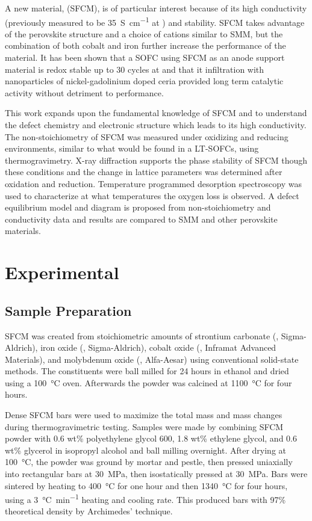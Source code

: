     A new material,  (SFCM), is of particular interest because of its high conductivity (previously measured to be \SI{35}{S\per\centi\meter} at ) and stability.\cite{Pan}
    SFCM takes advantage of the perovskite structure and a choice of cations similar to SMM, but the combination of both cobalt and iron further increase the performance of the material.
    It has been shown that a SOFC using SFCM as an anode support material is redox stable up to 30 cycles at  and that it infiltration with nanoparticles of nickel-gadolinium doped ceria provided long term catalytic activity without detriment to performance.\cite{Hussaina,Hussain}

    This work expands upon the fundamental knowledge of SFCM and to understand the defect chemistry and electronic structure which leads to its high conductivity.
    The non-stoichiometry of SFCM was measured under oxidizing and reducing environments, similar to what would be found in a LT-SOFCs, using thermogravimetry.
    X-ray diffraction supports the phase stability of SFCM though these conditions and the change in lattice parameters was determined after oxidation and reduction.
    Temperature programmed desorption spectroscopy was used to characterize at what temperatures the oxygen loss is observed.
    A defect equilibrium model and diagram is proposed from non-stoichiometry and conductivity data and results are compared to SMM and other perovskite materials.

\section{Experimental}
    \subsection{Sample Preparation}
        SFCM was created from stoichiometric amounts of strontium carbonate (, Sigma-Aldrich), iron oxide (, Sigma-Aldrich), cobalt oxide (, Inframat Advanced Materials), and molybdenum oxide (, Alfa-Aesar) using conventional solid-state methods.
        The constituents were ball milled for 24 hours in ethanol and dried using a \SI{100}{\celsius} oven.
        Afterwards the powder was calcined at \SI{1100}{\celsius} for four hours.

        Dense SFCM bars were used to maximize the total mass and mass changes during thermogravimetric testing.
        Samples were made by combining SFCM powder with 0.6 wt\% polyethylene glycol 600, 1.8 wt\% ethylene glycol, and 0.6 wt\% glycerol in isopropyl alcohol and ball milling overnight.
        After drying at \SI{100}{\celsius}, the powder was ground by mortar and pestle, then pressed uniaxially into rectangular bars at \SI{30}{\mega\pascal}, then isostatically pressed at \SI{30}{\mega\pascal}.
        Bars were sintered by heating to \SI{400}{\celsius} for one hour and then \SI{1340}{\celsius} for four hours, using a \SI{3}{\celsius\per\minute} heating and cooling rate.
        This produced bars with 97\% theoretical density by Archimedes' technique.

